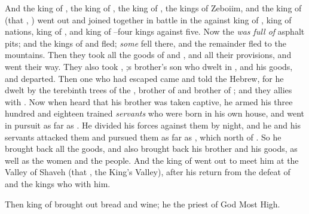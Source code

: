 \bverse And the king of , the king of , the king of , the kings of Zeboiim, and the king of  (that \is, ) went out and joined together in battle in the 
\bverse against  king of ,  king of nations,  king of , and  king of --four kings against five.
\bverse Now the  \textit{was full of} asphalt pits; and the kings of  and  fled; \textit{some} fell there, and the remainder fled to the mountains.
\bverse Then they took all the goods of  and , and all their provisions, and went their way.
\bverse They also took , ;s brother's son who dwelt in , and his goods, and departed.
\bverse Then one who had escaped came and told  the Hebrew, for he dwelt by the terebinth trees of  the , brother of  and brother of ; and they \were allies with .
\bverse Now when  heard that his brother was taken captive, he armed his three hundred and eighteen trained \textit{servants} who were born in his own house, and went in pursuit as far as .
\bverse He divided his forces against them by night, and he and his servants attacked them and pursued them as far as , which \is north of .
\bverse So he brought back all the goods, and also brought back his brother  and his goods, as well as the women and the people.
\bverse And the king of  went out to meet him at the Valley of Shaveh (that \is, the King's Valley), after his return from the defeat of  and the kings who \were with him.


\bverse Then  king of  brought out bread and wine; he \was the priest of God Most High.

